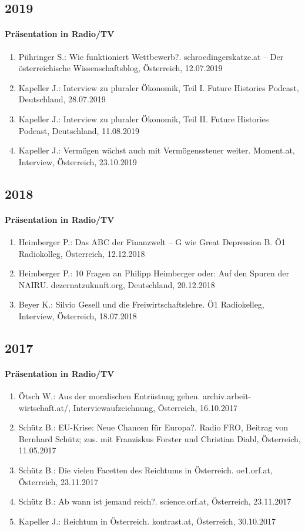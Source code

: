 \subsection*{2019}
\paragraph{Präsentation in Radio/TV}
\begin{enumerate}
	\item Pühringer S.: Wie funktioniert Wettbewerb?. schroedingerskatze.at -- Der österreichische Wissenschaftsblog, Österreich, 12.07.2019
	\item Kapeller J.: Interview zu pluraler Ökonomik, Teil I. Future Histories Podcast, Deutschland, 28.07.2019
	\item Kapeller J.: Interview zu pluraler Ökonomik, Teil II. Future Histories Podcast, Deutschland, 11.08.2019
	\item Kapeller J.: Vermögen wächst auch mit Vermögenssteuer weiter. Moment.at, Interview, Österreich, 23.10.2019
\end{enumerate}
\subsection*{2018}
\paragraph{Präsentation in Radio/TV}
\begin{enumerate}
	\item Heimberger P.: Das ABC der Finanzwelt -- G wie Great Depression B. Ö1 Radiokolleg, Österreich, 12.12.2018
	\item Heimberger P.: 10 Fragen an Philipp Heimberger oder: Auf den Spuren der NAIRU. dezernatzukunft.org, Deutschland, 20.12.2018
	\item Beyer K.: Silvio Gesell und die Freiwirtschaftslehre. Ö1 Radiokelleg, Interview, Österreich, 18.07.2018
\end{enumerate}
\subsection*{2017}
\paragraph{Präsentation in Radio/TV}
\begin{enumerate}
	\item Ötsch W.: Aus der moralischen Entrüstung gehen. archiv.arbeit-wirtschaft.at/, Interviewaufzeichnung, Österreich, 16.10.2017
	\item Schütz B.: EU-Krise: Neue Chancen für Europa?. Radio FRO, Beitrag von Bernhard Schütz; zus. mit Franziskus Forster und Christian Diabl, Österreich, 11.05.2017
	\item Schütz B.: Die vielen Facetten des Reichtums in Österreich. oe1.orf.at, Österreich, 23.11.2017
	\item Schütz B.: Ab wann ist jemand reich?. science.orf.at, Österreich, 23.11.2017
	\item Kapeller J.: Reichtum in Österreich. kontrast.at, Österreich, 30.10.2017
\end{enumerate}
